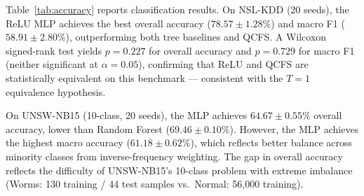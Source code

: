 \documentclass[10pt,twocolumn]{article}
\begin{document}
\begin{table}[t]
\centering
\caption{Test accuracy (\%, mean$\pm$std) on NSL-KDD ($n{=}20$ seeds),
UNSW-NB15 ($n{=}20$), and CICIDS2017 ($n{=}10$). Best per dataset in \textbf{bold}. NPU = deployable on
Neural-ART NPU.}
\label{tab:accuracy}
\small
{}
\end{table}

Table~\ref{tab:accuracy} reports classification results.
On NSL-KDD (20 seeds), the ReLU MLP achieves the best overall accuracy
($78.57{\pm}1.28$\%) and macro F1 ($58.91{\pm}2.80$\%), outperforming
both tree baselines and QCFS.
A Wilcoxon signed-rank test yields $p{=}0.227$ for overall accuracy
and $p{=}0.729$ for macro F1 (neither significant at $\alpha{=}0.05$),
confirming that ReLU and QCFS are statistically equivalent on this
benchmark --- consistent with the $T{=}1$ equivalence hypothesis.

On UNSW-NB15 (10-class, 20 seeds), the MLP achieves $64.67{\pm}0.55$\% overall
accuracy, lower than Random Forest ($69.46{\pm}0.10$\%). However, the
MLP achieves the highest macro accuracy ($61.18{\pm}0.62$\%), which
reflects better balance across minority classes from inverse-frequency
weighting.
The gap in overall accuracy reflects the difficulty of UNSW-NB15's
10-class problem with extreme imbalance (Worms: 130 training / 44 test
samples vs.\ Normal: 56,000 training).
\end{document}
